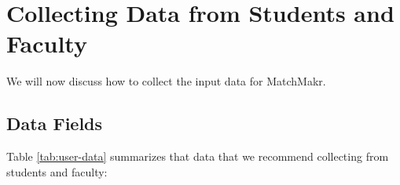 \newcommand{\tabline}[4]{#1 & #2 & #3 & #4\\ \hline}
\newcommand{\tabheader}[4]{\hline \textbf{#1} & \textbf{#2} & \textbf{#3} & \textbf{#4}\\ \hline \hline}
\renewcommand{\arraystretch}{1.25}

\newcommand{\pbthirty}[1]{\parbox[t]{0.3\textwidth}{#1}}

\newcommand{\pbtwo}[1]{\parbox[t]{0.3\textwidth}{#1}}
\newcommand{\tabheadertwo}[2]{\hline \textbf{#1} & \textbf{#2} \\ \hline \hline}
\newcommand{\tablinetwo}[2]{#1 & #2 \\ \hline}



\newcommand{\cwidth}{1in}
\newcommand{\notrecommended}{\parbox[t]{\cwidth}{\centering{Not \\Recommended}}}
\newcommand{\pb}[1]{\parbox[t]{1.5in}{#1 \\}}
\newcommand{\olist}[1]{	$1^\text{st}$ #1 \\
						$2^\text{nd}$ #1 \\
						$3^\text{rd}$ #1 \\
						$\vdots$ \\
						$10^\text{th}$ #1 \\}
						



\chapter{Collecting Data from Students and Faculty}

We will now discuss how to collect the input data for MatchMakr.

\section{Data Fields}
Table \ref{tab:user-data} summarizes that data that we recommend collecting from students and faculty:


